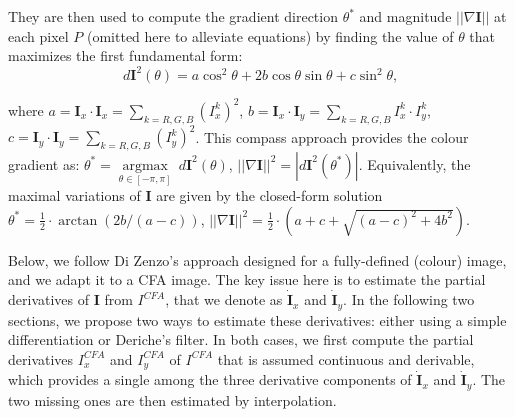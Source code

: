 \documentclass[twoside]{article}
\begin{document}
\noindent They are then used to compute the gradient direction $\theta^{*}$ and magnitude $||\nabla \mathbf{I}||$ at each pixel $P$ (omitted here to alleviate equations) by finding the value of $\theta$ that maximizes the first fundamental form:
\begin{equation}\label{eq:dI^2}
	d \textbf{I}^2(\theta)= a \cos^2 \theta + 2 b\cos \theta \sin \theta + c \sin^2 \theta \text{,}
\end{equation}

\noindent where $a = \textbf{I}_x \cdot \textbf{I}_x = \sum_{k=R,G,B} (I^k_x)^2$, $b = \textbf{I}_x \cdot \textbf{I}_y = \sum_{k=R,G,B} I^k_x \cdot I^k_y$, $c = \textbf{I}_y \cdot \textbf{I}_y = \sum_{k=R,G,B} (I^k_y)^2$. This compass approach provides the colour gradient as: $\theta^{*} = \underset{\theta \in [-\pi,\pi]}{\operatorname{argmax}}~d \textbf{I}^2(\theta)$, $||\nabla \mathbf{I}||^2 = \left| d \textbf{I}^2( \theta^{*}) \right|$. Equivalently, the maximal variations of $\mathbf{I}$ are given by the closed-form solution $\theta^{*} = \frac{1}{2} \cdot \arctan \left( 2b / (a-c) \right)$, $||\nabla \mathbf{I}||^2=\frac{1}{2} \cdot \left( a + c+ \sqrt{(a-c)^2+4b^2} \right)$. 

Below, we follow Di Zenzo's approach designed for a fully-defined (colour) image, and we adapt it to a CFA image. The key issue here is to estimate the partial derivatives of $\mathbf{I}$ from $I^{CFA}$, that we denote as $\dot{\textbf{I}}_x$ and $\dot{\textbf{I}}_y$. In the following two sections, we propose two ways to estimate these derivatives: either using a simple differentiation or Deriche's filter. In both cases, we first compute the partial derivatives $I^{CFA}_x$ and $I^{CFA}_y$ of $I^{CFA}$ that is assumed continuous and derivable, which provides a single among the three derivative components of $\dot{\textbf{I}}_x$ and $\dot{\textbf{I}}_y$. The two missing ones are then estimated by interpolation.



%
%
\end{document}
